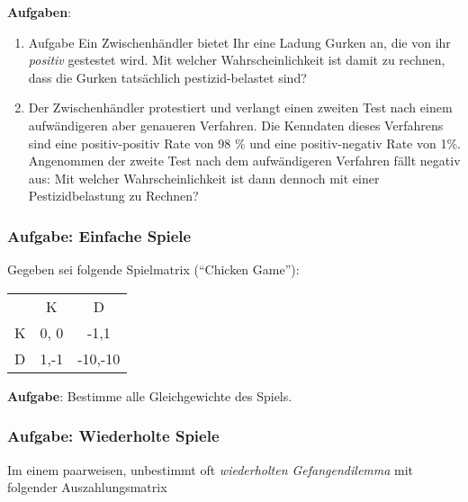 \vspace{0.5cm}

{\bf Aufgaben}:
\begin{enumerate}
  \item Aufgabe Ein Zwischenhändler bietet Ihr eine Ladung Gurken an, die von
  ihr {\em positiv} gestestet wird. Mit welcher Wahrscheinlichkeit ist damit zu
  rechnen, dass die Gurken tatsächlich pestizid-belastet sind?
  \item Der Zwischenhändler protestiert und verlangt einen zweiten Test nach
  einem aufwändigeren aber genaueren Verfahren. Die Kenndaten dieses Verfahrens 
  sind eine positiv-positiv Rate von 98 \% und eine positiv-negativ Rate von
  1\%. Angenommen der zweite Test nach dem aufwändigeren Verfahren fällt
  negativ aus: Mit welcher Wahrscheinlichkeit ist dann dennoch mit einer
  Pestizidbelastung zu Rechnen?
\end{enumerate}

\vspace{1cm}


\subsubsection{Aufgabe: Einfache Spiele}

Gegeben sei folgende Spielmatrix ("`Chicken Game"'):

\begin{center}
\begin{tabular}{c|c|c|}
\multicolumn{1}{c}{} & \multicolumn{1}{c}{K} &
                               \multicolumn{1}{c}{D} \\ \cline{2-3} 
K               & 0, 0           & -1,1      
\\ \cline{2-3} 
D               & 1,-1           & -10,-10
\\ \cline{2-3}
\end{tabular}
\end{center}  


\vspace{0.5cm}

{\bf Aufgabe}: Bestimme alle Gleichgewichte des Spiels.

\vspace{0.75cm}

\subsubsection{Aufgabe: Wiederholte Spiele}

Im einem paarweisen, unbestimmt oft {\em wiederholten Gefangendilemma} mit
folgender Auszahlungsmatrix

